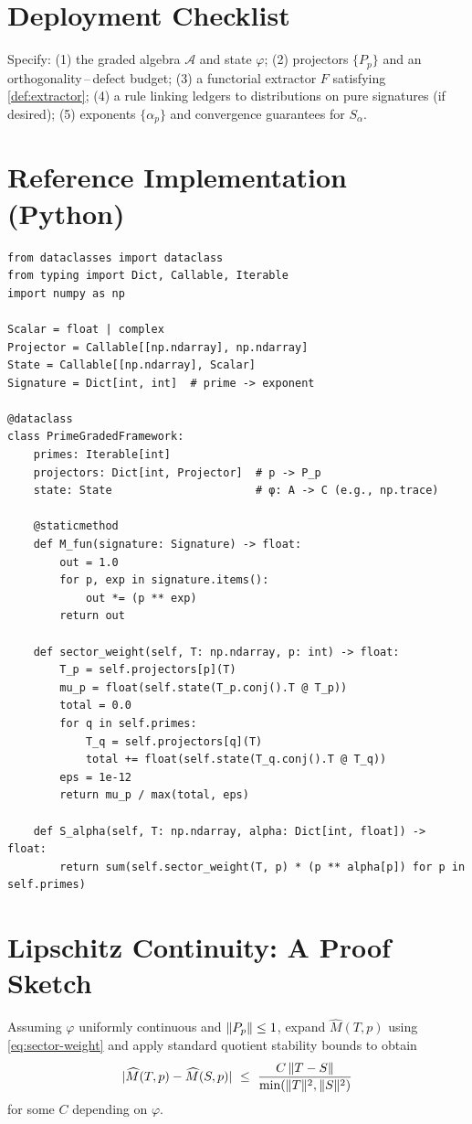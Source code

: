 \documentclass[11pt]{article}
\theoremstyle{definition}
\theoremstyle{plain}
\theoremstyle{remark}
\newcommand{\A}{\mathcal{A}}
\newcommand{\Mhat}{\widehat{M}}
\DeclarePairedDelimiter{\norm}{\lVert}{\rVert}
\DeclarePairedDelimiter{\abs}{\lvert}{\rvert}
\begin{document}
\section{Deployment Checklist}
Specify: (1) the graded algebra $\A$ and state $\varphi$; (2) projectors $\{P_p\}$ and an orthogonality\,–\,defect budget; (3) a functorial extractor $F$ satisfying \cref{def:extractor}; (4) a rule linking ledgers to distributions on pure signatures (if desired); (5) exponents $\{\alpha_p\}$ and convergence guarantees for $S_{\alpha}$.

\appendix
\section{Reference Implementation (Python)}
\begin{lstlisting}
from dataclasses import dataclass
from typing import Dict, Callable, Iterable
import numpy as np

Scalar = float | complex
Projector = Callable[[np.ndarray], np.ndarray]
State = Callable[[np.ndarray], Scalar]
Signature = Dict[int, int]  # prime -> exponent

@dataclass
class PrimeGradedFramework:
    primes: Iterable[int]
    projectors: Dict[int, Projector]  # p -> P_p
    state: State                      # φ: A -> C (e.g., np.trace)

    @staticmethod
    def M_fun(signature: Signature) -> float:
        out = 1.0
        for p, exp in signature.items():
            out *= (p ** exp)
        return out

    def sector_weight(self, T: np.ndarray, p: int) -> float:
        T_p = self.projectors[p](T)
        mu_p = float(self.state(T_p.conj().T @ T_p))
        total = 0.0
        for q in self.primes:
            T_q = self.projectors[q](T)
            total += float(self.state(T_q.conj().T @ T_q))
        eps = 1e-12
        return mu_p / max(total, eps)

    def S_alpha(self, T: np.ndarray, alpha: Dict[int, float]) -> float:
        return sum(self.sector_weight(T, p) * (p ** alpha[p]) for p in self.primes)
\end{lstlisting}

\section{Lipschitz Continuity: A Proof Sketch}
Assuming $\varphi$ uniformly continuous and $\norm{P_p}\le 1$, expand $\Mhat(T,p)$ using \cref{eq:sector-weight} and apply standard quotient stability bounds to obtain
\[
\abs{\Mhat(T,p)-\Mhat(S,p)}\ \le\ \frac{C\,\norm{T-S}}{\min(\norm{T}^2,\norm{S}^2)}
\]
for some $C$ depending on $\varphi$.
\end{document}

